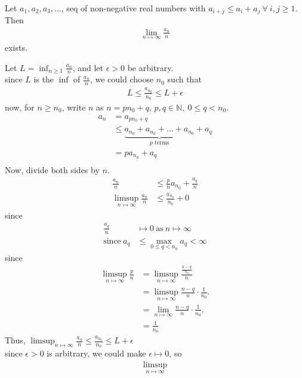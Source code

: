 \documentclass{article}
\begin{document}
\maketitle
\pagebreak

\begin{homeworkProblem}
    Let $a_1, a_2, a_3, \ldots$, seq of non-negative real numbers with 
    $a_{i+j} \leq a_i + a_j \ \forall \ i,j \geq 1$. Then
    \begin{align}
        \lim_{n \mapsto \infty} \frac{ a_n }{ n }
    \end{align}
    exists.\\
    \solution

    Let $L = \inf_{n \geq 1} \frac{ a_n }{ n }$,
    and let $\epsilon > 0$ be arbitrary.\\
    since $L$ is the $\inf$ of $\frac{ a_n }{ n }$, 
    we could choose $n_0$ such that 
    \begin{align}
        L \leq \frac{ a_{n_0} }{ n_0 } \leq L + \epsilon
    \end{align}
    now, for $n \geq n_0$, 
    write $n$ as $n=p n_0 + q$, $p,q \in \mathbb{N}, \ 0 \leq q < n_0$.
    \begin{align}
        a_n &= a_{p n_0 + q}\\ 
        &\leq \underbrace{a_{n_0} + a_{n_0} + \ldots + a_{n_0}}_{p \text{ terms}} + a_q\\
        &= p a_{n_0} + a_q\\
    \end{align}
    Now, divide both sides by $n$.
    \begin{align}
        \frac{ a_n }{ n } &\leq \frac{ p }{ n }a_{n_0} + \frac{ a_q }{ n }\\
        \limsup_{n \mapsto \infty} \frac{ a_n }{ n } &\leq \frac{ a_{n_0} }{ n_0 } + 0
    \end{align}
    since 
    \begin{align}
        \frac{ a_q }{ n } &\mapsto 0 \ \text{as} \ n \mapsto \infty\\
        \text{since} \ a_q &\leq \max_{0 \leq q < n_0} a_q < \infty
    \end{align}
    since 
    \begin{align}
        \limsup_{n \mapsto \infty} \frac{ p }{ n } 
        &= \limsup_{n \mapsto \infty} \frac{ \frac{ n-q }{ n_0 } }{ n }\\ 
        &= \limsup_{n \mapsto \infty} \frac{ n-q }{ n } \cdot \frac{ 1 }{ n_0 }.\\
        &= \lim_{n \mapsto \infty} \frac{ n-q }{ n } \cdot \frac{ 1 }{ n_0 }.\\
        &= \frac{ 1 }{ n_0 }
    \end{align}
    Thus, $\limsup_{n \mapsto \infty} \frac{ a_n }{ n } \leq \frac{ a_{n_0} }{ n_0 } \leq L + \epsilon$\\
    since $\epsilon > 0$ is arbitrary, we could make $\epsilon \mapsto 0$, so
    \begin{align}
        \limsup_{n \mapsto \infty}
    \end{align}
    

\end{homeworkProblem}
\end{document}

